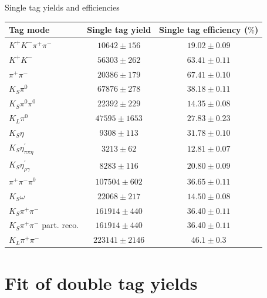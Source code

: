 \documentclass{beamer}
\begin{document}
\begin{frame}{Single tag yields and efficiencies}
  \begin{center}
    \begin{tabular}{lcc}
      Tag mode                          & Single tag yield     & Single tag efficiency ($\%$) \\
      \hline
      $K^+K^-\pi^+\pi^-$                & $10642 \pm 156$      & $19.02 \pm 0.09$     \\
      \hline
      $K^+K^-$                          & $56303 \pm 262$      & $63.41 \pm 0.11$     \\
      $\pi^+\pi^-$                      & $20386 \pm 179$      & $67.41 \pm 0.10$     \\
      $K_S\pi^0$                        & $67876 \pm 278$      & $38.18 \pm 0.11$     \\
      $K_S\pi^0\pi^0$                   & $22392 \pm 229$      & $14.35 \pm 0.08$     \\
      $K_L\pi^0$                        & $47595 \pm 1653$     & $27.83 \pm 0.23$     \\
      \hline
      $K_S\eta$                         & $9308 \pm 113$       & $31.78 \pm 0.10$     \\
      $K_S\eta^\prime_{\pi\pi\eta}$     & $3213 \pm 62$        & $12.81 \pm 0.07$     \\
      $K_S\eta^\prime_{\rho\gamma}$     & $8283 \pm 116$       & $20.80 \pm 0.09$     \\
      $\pi^+\pi^-\pi^0$                 & $107504 \pm 602$     & $36.65 \pm 0.11$     \\
      $K_S\omega$                       & $22068 \pm 217$      & $14.50 \pm 0.08$     \\
      \hline
      $K_S\pi^+\pi^-$                   & $161914 \pm 440$     & $36.40 \pm 0.11$     \\
      $K_S\pi^+\pi^-$ part. reco.       & $161914 \pm 440$     & $36.40 \pm 0.11$     \\
      $K_L\pi^+\pi^-$                   & $223141 \pm 2146$    & $46.1 \pm 0.3$       \\
      \hline
    \end{tabular}
  \end{center}
\end{frame}

\section{Fit of double tag yields}
\end{document}
